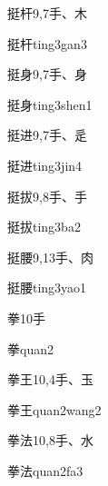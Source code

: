 \begin{Entry}{挺杆}{9,7}{⼿、⽊}
  \begin{Phonetics}{挺杆}{ting3gan3}
  \end{Phonetics}
\end{Entry}

\begin{Entry}{挺身}{9,7}{⼿、⾝}
  \begin{Phonetics}{挺身}{ting3shen1}
  \end{Phonetics}
\end{Entry}

\begin{Entry}{挺进}{9,7}{⼿、⾡}
  \begin{Phonetics}{挺进}{ting3jin4}
  \end{Phonetics}
\end{Entry}

\begin{Entry}{挺拔}{9,8}{⼿、⼿}
  \begin{Phonetics}{挺拔}{ting3ba2}
  \end{Phonetics}
\end{Entry}

\begin{Entry}{挺腰}{9,13}{⼿、⾁}
  \begin{Phonetics}{挺腰}{ting3yao1}
  \end{Phonetics}
\end{Entry}

\begin{Entry}{拳}{10}{⼿}
  \begin{Phonetics}{拳}{quan2}
  \end{Phonetics}
\end{Entry}

\begin{Entry}{拳王}{10,4}{⼿、⽟}
  \begin{Phonetics}{拳王}{quan2wang2}
  \end{Phonetics}
\end{Entry}

\begin{Entry}{拳法}{10,8}{⼿、⽔}
  \begin{Phonetics}{拳法}{quan2fa3}
  \end{Phonetics}
\end{Entry}

